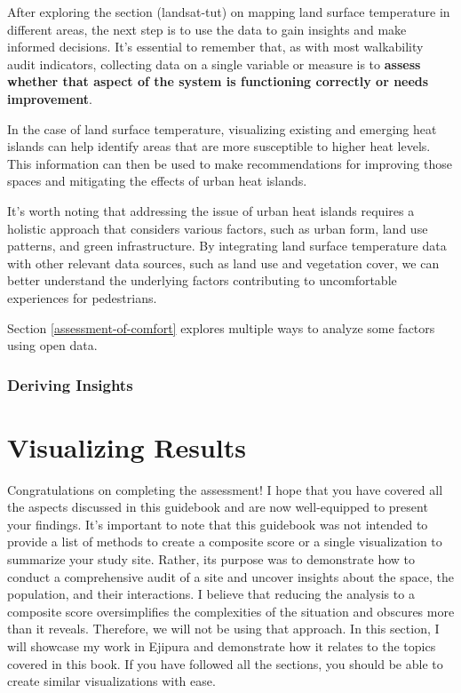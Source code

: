 \documentclass[
]{latex/krantz}
\begin{document}
After exploring the section \textcite{ref}(landsat-tut) on mapping land surface temperature in different areas, the next step is to use the data to gain insights and make informed decisions. It's essential to remember that, as with most walkability audit indicators, collecting data on a single variable or measure is to \textbf{assess whether that aspect of the system is functioning correctly or needs improvement}.

In the case of land surface temperature, visualizing existing and emerging heat islands can help identify areas that are more susceptible to higher heat levels. This information can then be used to make recommendations for improving those spaces and mitigating the effects of urban heat islands.

It's worth noting that addressing the issue of urban heat islands requires a holistic approach that considers various factors, such as urban form, land use patterns, and green infrastructure. By integrating land surface temperature data with other relevant data sources, such as land use and vegetation cover, we can better understand the underlying factors contributing to uncomfortable experiences for pedestrians.

Section \ref{assessment-of-comfort} explores multiple ways to analyze some factors using open data.

\hypertarget{deriving-insights}{%
\section{Deriving Insights}\label{deriving-insights}}

\hypertarget{part-visualizing-results}{%
\part{Visualizing Results}\label{part-visualizing-results}}

Congratulations on completing the assessment! I hope that you have covered all the aspects discussed in this guidebook and are now well-equipped to present your findings. It's important to note that this guidebook was not intended to provide a list of methods to create a composite score or a single visualization to summarize your study site. Rather, its purpose was to demonstrate how to conduct a comprehensive audit of a site and uncover insights about the space, the population, and their interactions. I believe that reducing the analysis to a composite score oversimplifies the complexities of the situation and obscures more than it reveals. Therefore, we will not be using that approach. In this section, I will showcase my work in Ejipura and demonstrate how it relates to the topics covered in this book. If you have followed all the sections, you should be able to create similar visualizations with ease.
\end{document}
